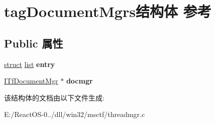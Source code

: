 \hypertarget{structtag_document_mgrs}{}\section{tag\+Document\+Mgrs结构体 参考}
\label{structtag_document_mgrs}
\subsection*{Public 属性}
\begin{DoxyCompactItemize}
\item 
\mbox{\label{structtag_document_mgrs_a5fd0653f7aa0c595749e9ff229417678}} 
\hyperlink{interfacestruct}{struct} \hyperlink{classlist}{list} {\bfseries entry}
\item 
\mbox{\label{structtag_document_mgrs_a4bca547e1d6783323aed24719ddc3d92}} 
\hyperlink{interface_i_tf_document_mgr}{I\+Tf\+Document\+Mgr} $\ast$ {\bfseries docmgr}
\end{DoxyCompactItemize}


该结构体的文档由以下文件生成\+:\begin{DoxyCompactItemize}
\item 
E\+:/\+React\+O\+S-\/0../dll/win32/msctf/threadmgr.\+c\end{DoxyCompactItemize}
